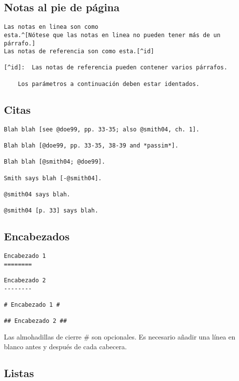\documentclass[
  12pt,
  spanish,
]{article}
\begin{document}
\hypertarget{notas-al-pie-de-puxe1gina}{%
\subsection{Notas al pie de página}\label{notas-al-pie-de-puxe1gina}}

\begin{verbatim}
Las notas en linea son como
esta.^[Nótese que las notas en linea no pueden tener más de un párrafo.]
Las notas de referencia son como esta.[^id]

[^id]:  Las notas de referencia pueden contener varios párrafos.

    Los parámetros a continuación deben estar identados.
\end{verbatim}

\hypertarget{citas}{%
\subsection{Citas}\label{citas}}

\begin{verbatim}
Blah blah [see @doe99, pp. 33-35; also @smith04, ch. 1].

Blah blah [@doe99, pp. 33-35, 38-39 and *passim*].

Blah blah [@smith04; @doe99].

Smith says blah [-@smith04].

@smith04 says blah.

@smith04 [p. 33] says blah.
\end{verbatim}

\hypertarget{encabezados}{%
\subsection{Encabezados}\label{encabezados}}

\begin{verbatim}
Encabezado 1
========

Encabezado 2
--------

# Encabezado 1 #

## Encabezado 2 ##
\end{verbatim}

Las almohadillas de cierre \# son opcionales. Es necesario añadir una
línea en blanco antes y después de cada cabecera.

\hypertarget{listas}{%
\subsection{Listas}\label{listas}}
\end{document}
